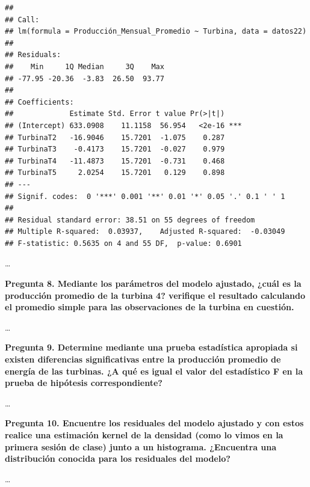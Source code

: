 \documentclass[
]{article}
\begin{document}
\begin{verbatim}
## 
## Call:
## lm(formula = Producción_Mensual_Promedio ~ Turbina, data = datos22)
## 
## Residuals:
##    Min     1Q Median     3Q    Max 
## -77.95 -20.36  -3.83  26.50  93.77 
## 
## Coefficients:
##             Estimate Std. Error t value Pr(>|t|)    
## (Intercept) 633.0908    11.1158  56.954   <2e-16 ***
## TurbinaT2   -16.9046    15.7201  -1.075    0.287    
## TurbinaT3    -0.4173    15.7201  -0.027    0.979    
## TurbinaT4   -11.4873    15.7201  -0.731    0.468    
## TurbinaT5     2.0254    15.7201   0.129    0.898    
## ---
## Signif. codes:  0 '***' 0.001 '**' 0.01 '*' 0.05 '.' 0.1 ' ' 1
## 
## Residual standard error: 38.51 on 55 degrees of freedom
## Multiple R-squared:  0.03937,    Adjusted R-squared:  -0.03049 
## F-statistic: 0.5635 on 4 and 55 DF,  p-value: 0.6901
\end{verbatim}

\ldots{}

\noindent\textbf{Pregunta 8. Mediante los parámetros del modelo ajustado, ¿cuál es la producción promedio de la turbina 4? verifique el resultado calculando el promedio simple para las observaciones de la turbina en cuestión.}

\ldots{}

\noindent\textbf{Pregunta 9. Determine mediante una prueba estadística apropiada si existen diferencias significativas entre la producción promedio de energía de las turbinas. ¿A qué es igual el valor del estadístico F en la prueba de hipótesis correspondiente?}

\ldots{}

\noindent\textbf{Pregunta 10. Encuentre los residuales del modelo ajustado y con estos realice una estimación kernel de la densidad (como lo vimos en la primera sesión de clase) junto a un histograma. ¿Encuentra una distribución conocida para los residuales del modelo?}

\ldots{}
\end{document}
